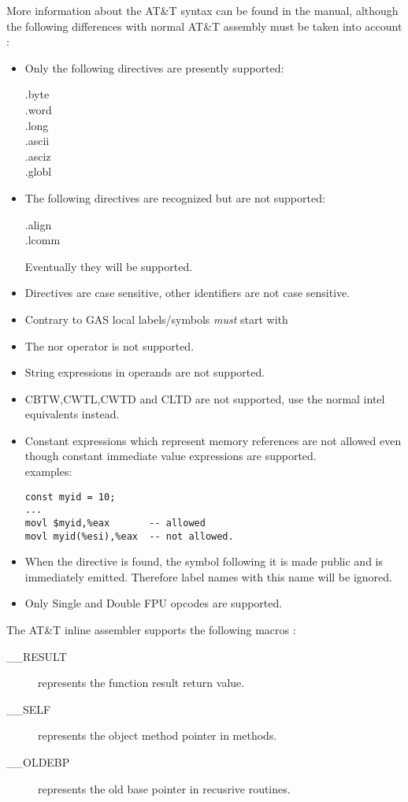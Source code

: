 \documentclass{report}
\begin{document}
More information about the AT\&T syntax can be found in the  manual,
although the following differences with normal AT\&T assembly must be taken
into account :
\begin{itemize}
\item  Only the following directives are presently supported:
 \begin{description}
\item[.byte]
\item[.word]
\item[.long]
\item[.ascii]
\item[.asciz]
\item[.globl]
\end{description}
\item  The following directives are recognized but are not
   supported:
\begin{description}
\item[.align]
\item[.lcomm]
\end{description} 
Eventually they will be supported.
\item Directives are case sensitive, other identifiers are not case sensitive.
\item  Contrary to GAS local labels/symbols {\em must} start with 
\item  The nor operator  is not supported.
\item  String expressions in operands are not supported.
\item  CBTW,CWTL,CWTD and CLTD are not supported, use the normal intel
equivalents instead.
\item  Constant expressions which represent memory references are not 
allowed even though constant immediate value expressions are supported. \\
examples:
\begin{verbatim}
const myid = 10;
...
movl $myid,%eax       -- allowed
movl myid(%esi),%eax  -- not allowed.
\end{verbatim}
\item When the  directive is found, the symbol following
    it is made public and is immediately emitted.
    Therefore label names with this name will be ignored.
\item  Only Single and Double FPU opcodes are supported.
\end{itemize} 

The AT\&T inline assembler supports the following macros :
\begin{description}
\item [\_\_RESULT] represents the function result return value.
\item [\_\_SELF]   represents the object method pointer in methods.
\item [\_\_OLDEBP] represents the old base pointer in recusrive routines.
\end{description}
\end{document}
